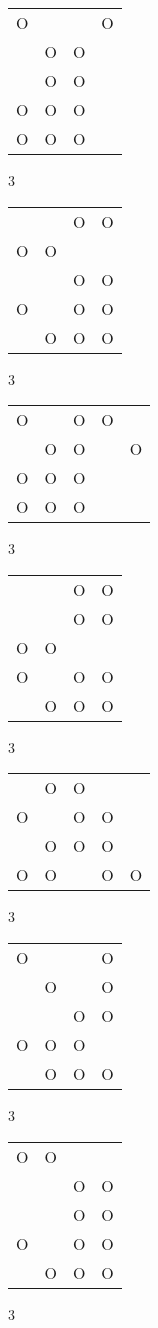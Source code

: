 \begin{tabular}{|m{0.2cm}m{0.2cm}m{0.2cm}m{0.2cm}|}\hline
O& & &O\\
 &O&O& \\
 &O&O& \\
O&O&O& \\
O&O&O& \\
\hline\end{tabular}3
\begin{tabular}{|m{0.2cm}m{0.2cm}m{0.2cm}m{0.2cm}|}\hline
 & &O&O\\
O&O& & \\
 & &O&O\\
O& &O&O\\
 &O&O&O\\
\hline\end{tabular}3
\begin{tabular}{|m{0.2cm}m{0.2cm}m{0.2cm}m{0.2cm}m{0.2cm}|}\hline
O& &O&O& \\
 &O&O& &O\\
O&O&O& & \\
O&O&O& & \\
\hline\end{tabular}3
\begin{tabular}{|m{0.2cm}m{0.2cm}m{0.2cm}m{0.2cm}|}\hline
 & &O&O\\
 & &O&O\\
O&O& & \\
O& &O&O\\
 &O&O&O\\
\hline\end{tabular}3
\begin{tabular}{|m{0.2cm}m{0.2cm}m{0.2cm}m{0.2cm}m{0.2cm}|}\hline
 &O&O& & \\
O& &O&O& \\
 &O&O&O& \\
O&O& &O&O\\
\hline\end{tabular}3
\begin{tabular}{|m{0.2cm}m{0.2cm}m{0.2cm}m{0.2cm}|}\hline
O& & &O\\
 &O& &O\\
 & &O&O\\
O&O&O& \\
 &O&O&O\\
\hline\end{tabular}3
\begin{tabular}{|m{0.2cm}m{0.2cm}m{0.2cm}m{0.2cm}|}\hline
O&O& & \\
 & &O&O\\
 & &O&O\\
O& &O&O\\
 &O&O&O\\
\hline\end{tabular}3
